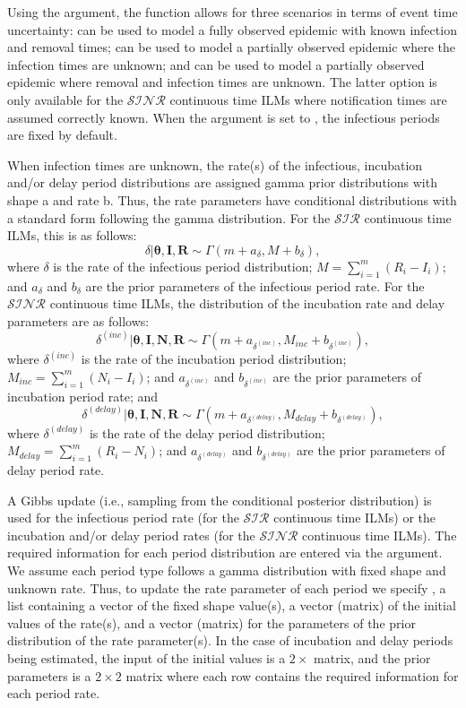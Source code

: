\documentclass[nojss,shortnames]{jss}
\begin{document}
Using the  argument, the  function allows for three scenarios in terms of event time uncertainty:  can be used to model a fully observed epidemic with known infection and removal times;  can be used to model a partially observed epidemic where the infection times are unknown; and  can be used to model a partially observed epidemic where removal and infection times are unknown. The latter option is only available for the $\mathcal{SINR}$ continuous time ILMs where notification times are assumed correctly known. When the  argument is set to , the infectious periods are fixed by default.

When infection times are unknown, the rate(s) of the infectious, incubation and/or delay period distributions are assigned gamma prior distributions with shape a and rate b. Thus, the rate parameters have conditional distributions with a standard form following the gamma distribution. For the $\mathcal{SIR}$ continuous time ILMs, this is as follows: 
\[ \delta|\boldsymbol{\theta},\boldsymbol{I}, \boldsymbol{R} \sim \Gamma(m+a_{\delta},M+b_{\delta}), \]
\noindent where $\delta$ is the rate of the infectious period distribution; $M=\sum_{i=1}^{m}{(R_{i}-I_{i})}$; and $a_{\delta}$ and $b_{\delta}$ are the prior parameters of the infectious period rate. For the $\mathcal{SINR}$ continuous time ILMs, the distribution of the incubation rate and delay parameters are as follows: 
\[ \delta^{(inc)}|\boldsymbol{\theta},\boldsymbol{I},\boldsymbol{N}, \boldsymbol{R} \sim \Gamma(m+a_{\delta^{(inc)}},M_{inc}+b_{\delta^{(inc)}}), \]
\noindent where  $\delta^{(inc)}$ is the rate of the incubation period distribution; $M_{inc}=\sum_{i=1}^{m}{(N_{i}-I_{i})}$; and $a_{\delta^{(inc)}}$ and $b_{\delta^{(inc)}}$ are the prior parameters of incubation period rate; and
\[ \delta^{(delay)}|\boldsymbol{\theta},\boldsymbol{I},\boldsymbol{N}, \boldsymbol{R} \sim \Gamma(m+a_{\delta^{(delay)}},M_{delay}+b_{\delta^{(delay)}}), \]
\noindent where $\delta^{(delay)}$ is the rate of the delay period distribution; $M_{delay}=\sum_{i=1}^{m}{(R_{i}-N_{i})}$; and $a_{\delta^{(delay)}}$ and $b_{\delta^{(delay)}}$ are the prior parameters of delay period rate.

A Gibbs update (i.e., sampling from the conditional posterior distribution) is used for the infectious period rate (for the $\mathcal{SIR}$ continuous time ILMs) or the incubation and/or delay period rates (for the $\mathcal{SINR}$ continuous time ILMs). The required information for each period distribution are entered via the  argument. We assume each period type follows a gamma distribution with fixed shape and unknown rate. Thus, to update the rate parameter of each period we specify , a list containing a vector of the fixed shape value(s), a vector (matrix) of the initial values of the rate(s), and a vector (matrix) for the parameters of the prior distribution of the rate parameter(s). In the case of incubation and delay periods being estimated, the input of the initial values is a $2 \times$  matrix, and the prior parameters is a $2\times2$ matrix where each row contains the required information for each period rate.
\end{document}
